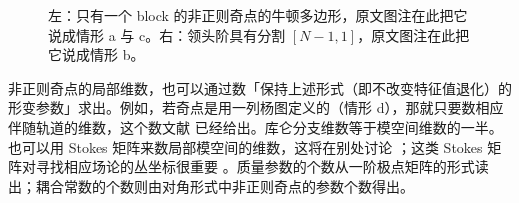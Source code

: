 \begin{figure}[tbp]
\centering

\caption{左：只有一个 block 的非正则奇点的牛顿多边形，原文图注在此把它说成情形 a 与 c。右：领头阶具有分割 $[N-1,1]$，原文图注在此把它说成情形 b。}
\label{fig:2}
\end{figure}


非正则奇点的局部维数，也可以通过数「保持上述形式（即不改变特征值退化）的形变参数」求出。例如，若奇点是用一列杨图定义的（情形 d），那就只要数相应伴随轨道的维数，这个数文献 \cite{29} 已经给出。库仑分支维数等于模空间维数的一半。也可以用 Stokes 矩阵来数局部模空间的维数，这将在别处讨论 \cite{30}；这类 Stokes 矩阵对寻找相应场论的丛坐标很重要 \cite{30}。质量参数的个数从一阶极点矩阵的形式读出；耦合常数的个数则由对角形式中非正则奇点的参数个数得出。
